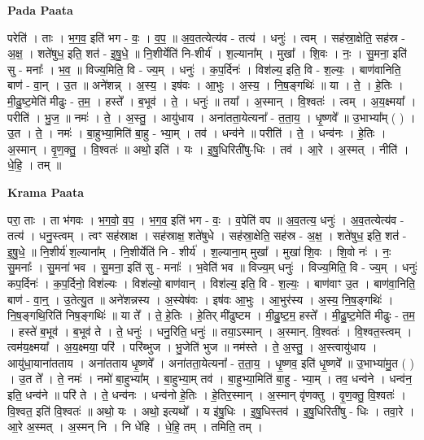 \documentclass[17pt]{extarticle}
\begin{document}
\textbf{Pada Paata} \newline

परेति॑ । ताः । भ॒ग॒व॒ इति॑ भग - वः॒ । व॒प॒ ॥ अ॒व॒तत्येत्य॑व - तत्य॑ । धनुः॑ । त्वम् । सह॑स्रा॒क्षेति॒ सह॑स्र - अ॒क्ष॒ । शते॑षुध॒ इति॒ शत॑ - इ॒षु॒धे॒ ॥ नि॒शीर्येति॑ नि-शीर्य॑ । श॒ल्याना᳚म् । मुखा᳚ । शि॒वः । नः॒ । सु॒मना॒ इति॑ सु - मनाः᳚ । भ॒व॒ ॥ विज्य॒मिति॒ वि - ज्य॒म् । धनुः॑ । क॒प॒र्दिनः॑ । विश॑ल्य॒ इति॒ वि - श॒ल्यः॒ । बाण॑वानिति॒ बाण॑ - वा॒न् । उ॒त ॥ अने॑शन्न् । अ॒स्य॒ । इष॑वः । आ॒भुः । अ॒स्य॒ । नि॒ष॒ङ्गथिः॑ ॥ या । ते॒ । हे॒तिः । मी॒ढु॒ष्ट॒मेति॑ मीढुः - त॒म॒ । हस्ते᳚ । ब॒भूव॑ । ते॒ । धनुः॑ ॥ तया᳚ । अ॒स्मान् । वि॒श्वतः॑ । त्वम् । अ॒य॒क्ष्मया᳚ । परीति॑ । भु॒ज॒ ॥ नमः॑ । ते॒ । अ॒स्तु॒ । आयु॑धाय । अना॑तता॒येत्यना᳚ - त॒ता॒य॒ । धृ॒ष्णवे᳚ ॥ उ॒भाभ्या᳚म् ( ) । उ॒त । ते॒ । नमः॑ । बा॒हुभ्या॒मिति॑ बा॒हु - भ्या॒म् । तव॑ । धन्व॑ने ॥ परीति॑ । ते॒ । धन्व॑नः । हे॒तिः । अ॒स्मान् । वृ॒ण॒क्तु॒ । वि॒श्वतः॑ ॥ अथो॒ इति॑ । यः । इ॒षु॒धिरिती॑षु-धिः । तव॑ । आ॒रे । अ॒स्मत् । नीति॑ । धे॒हि॒ । तम् ॥  \newline


\textbf{Krama Paata} \newline

परा॒ ताः । ता भ॑गवः । भ॒ग॒वो॒ व॒प॒ । भ॒ग॒व॒ इति॑ भग - वः॒ । व॒पेति॑ वप ॥ अ॒व॒तत्य॒ धनुः॑ । अ॒व॒तत्येत्य॑व - तत्य॑ । धनु॒स्त्वम् । त्वꣳ सह॑स्राक्ष । सह॑स्राक्ष॒ शते॑षुधे । सह॑स्रा॒क्षेति॒ सह॑स्र - अ॒क्ष॒ । शते॑षुध॒ इति॒ शत॑ - इ॒षु॒धे॒ ॥ नि॒शीर्य॑ श॒ल्याना᳚म् । नि॒शीर्येति॑ नि - शीर्य॑ । श॒ल्याना॒म् मुखा᳚ । मुखा॑ शि॒वः । शि॒वो नः॑ । नः॒ सु॒मनाः᳚ । सु॒मना॑ भव । सु॒मना॒ इति॑ सु - मनाः᳚ । भ॒वेति॑ भव ॥ विज्य॒म् धनुः॑ । विज्य॒मिति॒ वि - ज्य॒म् । धनुः॑ कप॒र्दिनः॑ । क॒प॒र्दिनो॒ विश॑ल्यः । विश॑ल्यो॒ बाण॑वान् । विश॑ल्य॒ इति॒ वि - श॒ल्यः॒ । बाण॑वाꣳ उ॒त । बाण॑वा॒निति॒ बाण॑ - वा॒न्॒ । उ॒तेत्यु॒त ॥ अने॑शन्नस्य । अ॒स्येष॑वः । इष॑वः आ॒भुः । आ॒भुर॑स्य । अ॒स्य॒ नि॒ष॒ङ्गथिः॑ । नि॒ष॒ङ्गथि॒रिति॑ निष॒ङ्गथिः॑ ॥ या ते᳚ । ते॒ हे॒तिः । हे॒तिर् मी॑ढुष्टम । मी॒ढु॒ष्ट॒म॒ हस्ते᳚ । मी॒ढु॒ष्ट॒मेति॑ मीढुः - त॒म॒ । हस्ते॑ ब॒भूव॑ । ब॒भूव॑ ते । ते॒ धनुः॑ । धनु॒रिति॒ धनुः॑ ॥ तया॒ऽस्मान् । अ॒स्मान्. वि॒श्वतः॑ । वि॒श्वत॒स्त्वम् । त्वम॑य॒क्ष्मया᳚ । अ॒य॒क्ष्मया॒ परि॑ । परि॑ब्भुज । भु॒जेति॑ भुज ॥ नम॑स्ते । ते॒ अ॒स्तु॒ । अ॒स्त्वायु॑धाय । आयु॑धा॒याना॑तताय । अना॑तताय धृ॒ष्णवे᳚ । अना॑तता॒येत्यना᳚ - त॒ता॒य॒ । धृ॒ष्णव॒ इति॑ धृ॒ष्णवे᳚ ॥ उ॒भाभ्या॑मु॒त ( ) । उ॒त ते᳚ । ते॒ नमः॑ । नमो॑ बा॒हुभ्या᳚म् । बा॒हुभ्या॒म् तव॑ । बा॒हुभ्या॒मिति॑ बा॒हु - भ्या॒म् । तव॒ धन्व॑ने । धन्व॑न॒ इति॒ धन्व॑ने ॥ परि॑ ते । ते॒ धन्व॑नः । धन्व॑नो हे॒तिः । हे॒तिर॒स्मान् । अ॒स्मान् वृ॑णक्तु । वृ॒ण॒क्तु॒ वि॒श्वतः॑ । वि॒श्वत॒ इति॑ वि॒श्वतः॑ ॥ अथो॒ यः । अथो॒ इत्यथो᳚ । य इ॑षु॒धिः । इ॒षु॒धिस्तव॑ । इ॒षु॒धिरिती॑षु - धिः । तवा॒रे । आ॒रे अ॒स्मत् । अ॒स्मन् नि । नि धे॑हि । धे॒हि॒ तम् । तमिति॒ तम् । \newline
\end{document}
